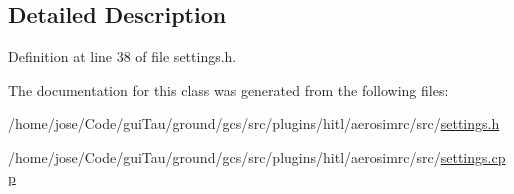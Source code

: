 \subsection{Detailed Description}


Definition at line 38 of file settings.\-h.



The documentation for this class was generated from the following files\-:\begin{DoxyCompactItemize}
\item 
/home/jose/\-Code/gui\-Tau/ground/gcs/src/plugins/hitl/aerosimrc/src/\hyperlink{settings_8h}{settings.\-h}\item 
/home/jose/\-Code/gui\-Tau/ground/gcs/src/plugins/hitl/aerosimrc/src/\hyperlink{settings_8cpp}{settings.\-cpp}\end{DoxyCompactItemize}
